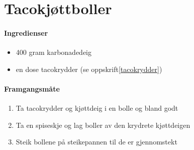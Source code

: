 \section{﻿Tacokjøttboller}

\paragraph{Ingredienser}
\begin{itemize}[noitemsep]
	\item 400 gram karbonadedeig
	\item en dose tacokrydder (se oppskrift\ref{tacokrydder})
\end{itemize}

\paragraph{Framgangsmåte}
\begin{enumerate}[noitemsep]
	\item Ta tacokrydder og kjøttdeig i en bolle og bland godt
	\item Ta en spiseskje og lag boller av den krydrete kjøttdeigen
	\item Steik bollene på steikepannen til de er gjennomstekt
\end{enumerate}

